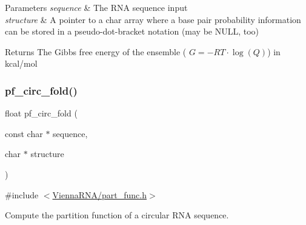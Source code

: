 \begin{DoxyParams}{Parameters}
{\em sequence} & The R\+NA sequence input \\
\hline
{\em structure} & A pointer to a char array where a base pair probability information can be stored in a pseudo-\/dot-\/bracket notation (may be N\+U\+LL, too) \\
\hline
\end{DoxyParams}
\begin{DoxyReturn}{Returns}
The Gibbs free energy of the ensemble ( $G = -RT \cdot \log(Q) $) in kcal/mol 
\end{DoxyReturn}
\mbox{\label{group__part__func__global__deprecated_ga819ce5fca8984004ac81c4a3b04cb735}} 
\subsubsection{\texorpdfstring{pf\+\_\+circ\+\_\+fold()}{pf\_circ\_fold()}}
{\footnotesize\ttfamily float pf\+\_\+circ\+\_\+fold (\begin{DoxyParamCaption}\item[{const char $\ast$}]{sequence,  }\item[{char $\ast$}]{structure }\end{DoxyParamCaption})}



{\ttfamily \#include $<$\hyperlink{part__func_8h}{Vienna\+R\+N\+A/part\+\_\+func.\+h}$>$}



Compute the partition function of a circular R\+NA sequence. 

